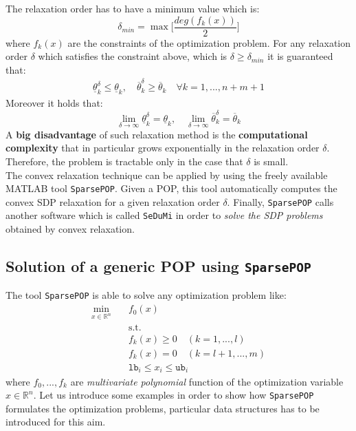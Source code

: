 \noindent
The relaxation order has to have a minimum value which is:
\begin{equation}
        \delta_{min} = \max \bigg[
            \frac{deg(f_k(x))}{2}
    \bigg]
\end{equation}
where $f_k(x)$ are the constraints of the optimization problem. 
For any relaxation order $\delta$ which satisfies the constraint above, which is $\delta \ge \delta_{min}$ it is guaranteed that:
\begin{align*}
    \underline{\theta}_k^\delta \le \underline{\theta}_k, \quad 
    \overline{\theta}_k^\delta \ge \overline{\theta}_k \quad \forall k=1,...,n+m+1 
\end{align*}
Moreover it holds that:
{\Large{
    \begin{equation}
        \lim_{\delta\to\infty}  \underline{\theta}_k^\delta = \underline{\theta}_k, \quad
        \lim_{\delta\to\infty} \overline{\theta}_k^\delta = \overline{\theta}_k
    \end{equation}
}}
A \textbf{big disadvantage} of such relaxation method is the \textbf{computational complexity} that in particular grows exponentially in the relaxation order $\delta$. Therefore, the problem is tractable only in the case that $\delta$ is small. \\
The convex relaxation technique can be applied by using the freely available MATLAB tool \texttt{SparsePOP}. Given a POP, this tool automatically computes the convex SDP relaxation for a given relaxation order $\delta$. Finally, \texttt{SparsePOP} calls another software which is called \texttt{SeDuMi} in order to \textit{solve the SDP problems} obtained by convex relaxation.

\subsection{Solution of a generic POP using \texttt{SparsePOP}}
The tool \texttt{SparsePOP} is able to solve any optimization problem like:
{\large{
    \begin{align*}
        \min_{x\in\mathbb{R}^n}  \quad & f_0(x)\\
        &\text{s.t.}\\
        &f_k(x)\ge 0 \quad (k=1,...,l)\\
        &f_k(x)=0 \quad (k=l+1, ..., m)\\
        &\texttt{lb}_i \le x_i \le \texttt{ub}_i
    \end{align*}
}}
where $f_0,...,f_k$ are \textit{multivariate polynomial} function of the optimization variable $x\in\mathbb{R}^n$.
Let us introduce some examples in order to show how \texttt{SparsePOP} formulates the optimization problems, particular data structures has to be introduced for this aim.

